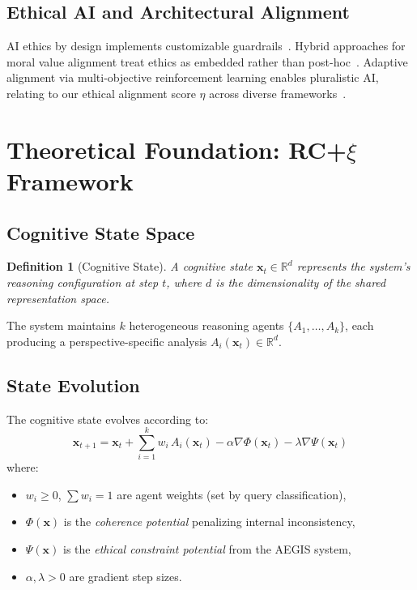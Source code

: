 \documentclass[11pt,a4paper]{article}
\newcommand{\rcxi}{RC+$\xi$}
\newtheorem{definition}{Definition}
\begin{document}
\subsection{Ethical AI and Architectural Alignment}
AI ethics by design implements customizable guardrails~\citep{sekrst2024ethics}. Hybrid approaches for moral value alignment treat ethics as embedded rather than post-hoc~\citep{tennant2023hybrid}. Adaptive alignment via multi-objective reinforcement learning enables pluralistic AI, relating to our ethical alignment score $\eta$ across diverse frameworks~\citep{harland2024adaptive}.

\section{Theoretical Foundation: \rcxi{} Framework}
\label{sec:theory}

\subsection{Cognitive State Space}

\begin{definition}[Cognitive State]
A cognitive state $\mathbf{x}_t \in \mathbb{R}^d$ represents the system's reasoning configuration at step $t$, where $d$ is the dimensionality of the shared representation space.
\end{definition}

The system maintains $k$ heterogeneous reasoning agents $\{A_1, \ldots, A_k\}$, each producing a perspective-specific analysis $A_i(\mathbf{x}_t) \in \mathbb{R}^d$.

\subsection{State Evolution}

The cognitive state evolves according to:
\begin{equation}
\label{eq:evolution}
\mathbf{x}_{t+1} = \mathbf{x}_t + \sum_{i=1}^{k} w_i \, A_i(\mathbf{x}_t) - \alpha \nabla\Phi(\mathbf{x}_t) - \lambda \nabla\Psi(\mathbf{x}_t)
\end{equation}
where:
\begin{itemize}[leftmargin=*,nosep]
  \item $w_i \geq 0$, $\sum w_i = 1$ are agent weights (set by query classification),
  \item $\Phi(\mathbf{x})$ is the \emph{coherence potential} penalizing internal inconsistency,
  \item $\Psi(\mathbf{x})$ is the \emph{ethical constraint potential} from the AEGIS system,
  \item $\alpha, \lambda > 0$ are gradient step sizes.
\end{itemize}
\end{document}
